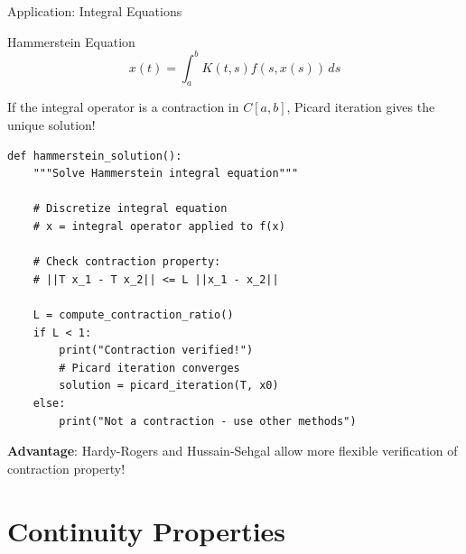 \documentclass[aspectratio=169,10pt]{beamer}
\begin{document}
\begin{frame}[fragile]{Application: Integral Equations}
    \begin{block}{Hammerstein Equation}
        \begin{equation*}
            x(t) = \int_a^b K(t,s) f(s, x(s)) \, ds
        \end{equation*}

        If the integral operator is a contraction in $C[a,b]$,
        Picard iteration gives the unique solution!
    \end{block}

    \begin{lstlisting}[basicstyle=\ttfamily\tiny]
def hammerstein_solution():
    """Solve Hammerstein integral equation"""

    # Discretize integral equation
    # x = integral operator applied to f(x)

    # Check contraction property:
    # ||T x_1 - T x_2|| <= L ||x_1 - x_2||

    L = compute_contraction_ratio()
    if L < 1:
        print("Contraction verified!")
        # Picard iteration converges
        solution = picard_iteration(T, x0)
    else:
        print("Not a contraction - use other methods")
    \end{lstlisting}

    \textbf{Advantage}: Hardy-Rogers and Hussain-Sehgal allow more
    flexible verification of contraction property!
\end{frame}

\section{Continuity Properties}
\end{document}
